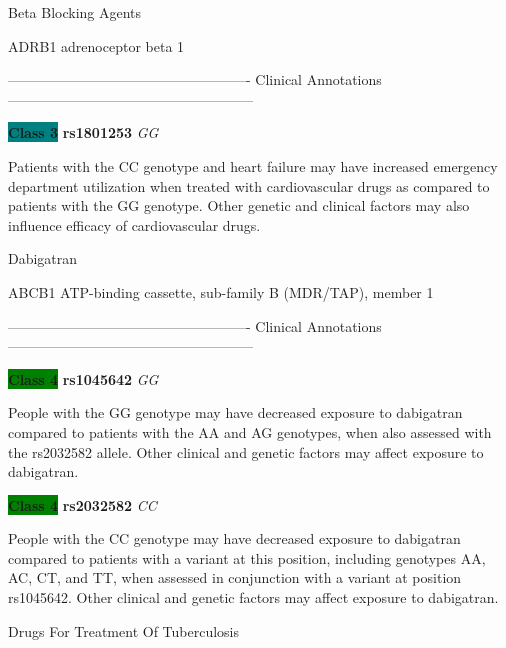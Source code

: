 \documentclass{resume} %
\begin{document}
\begin{rSection}{ Beta Blocking Agents }
\begin{rSubsection}{ ADRB1 }{ adrenoceptor beta 1 }{}{}
\item[] ---------------------------------------------------- Clinical Annotations -----------------------------------------------------\newline
\item \textbf{\colorbox{teal} {Class 3}} \textbf{ rs1801253 } \textit{ GG }
\item[] Patients with the CC genotype and heart failure may have increased emergency department utilization when treated with cardiovascular drugs as compared to patients with the GG genotype. Other genetic and clinical factors may also influence efficacy of cardiovascular drugs.
\end{rSubsection}

\end{rSection}\begin{rSection}{ Dabigatran }
\item[]

\begin{rSubsection}{ ABCB1 }{ ATP-binding cassette, sub-family B (MDR/TAP), member 1 }{}{}
\item[]

\item[] ---------------------------------------------------- Clinical Annotations -----------------------------------------------------\newline
\item \textbf{\colorbox{green} {Class 4}} \textbf{ rs1045642 } \textit{ GG }
\item[] People with the GG genotype may have decreased exposure to dabigatran compared to patients with the AA and AG genotypes, when also assessed with the rs2032582 allele. Other clinical and genetic factors may affect exposure to dabigatran.\item \textbf{\colorbox{green} {Class 4}} \textbf{ rs2032582 } \textit{ CC }
\item[] People with the CC genotype may have decreased exposure to dabigatran compared to patients with a variant at this position, including genotypes AA, AC, CT, and TT, when assessed in conjunction with a variant at position rs1045642. Other clinical and genetic factors may affect exposure to dabigatran. 
\end{rSubsection}

\end{rSection}\begin{rSection}{ Drugs For Treatment Of Tuberculosis }
\item[]


\end{rSection}
\end{document}

